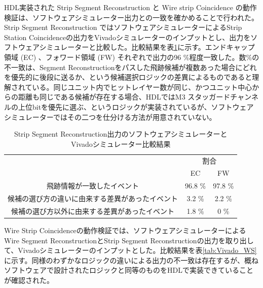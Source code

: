 HDL実装された Strip Segment Reconstruction と Wire strip Coincidence の動作検証は、ソフトウェアシミュレーター出力との一致を確かめることで行われた。Strip Segment Reconstruction ではソフトウェアシミュレーターによるStrip Station Coincidenceの出力をVivadoシミュレーターのインプットとし、出力をソフトウェアシミュレーターと比較した。比較結果を表\ref{tab:Vivado_strip}に示す。エンドキャップ領域 (EC) 、フォワード領域 (FW) それぞれで出力の96 \%程度一致した。数\%の不一致は、Segment Reconstructionをパスした飛跡候補が複数あった場合にどれを優先的に後段に送るか、という候補選択ロジックの差異によるものであると理解されている。同じユニット内でヒットレイヤー数が同じ、かつユニット中心からの距離も同じである候補が存在する場合、HDLではM3 スタッガードチャンネルの上位bitを優先に選ぶ、というロジックが実装されているが、ソフトウェアシミュレーターではその二つを仕分ける方法が用意されていない。

\begin{table}[]
    \centering
    \caption{Strip Segment Reconstruction出力のソフトウェアシミュレーターとVivadoシミュレーター比較結果}
    \label{tab:Vivado_strip}
    \begin{tabular}{|c|cc|}
    \hline
    \multirow{2}{*}{}        & \multicolumn{2}{c|}{割合}                \\ \cline{2-3} 
                             & \multicolumn{1}{c|}{EC}      & FW      \\ \hline\hline
    飛跡情報が一致したイベント            & \multicolumn{1}{c|}{96.8 \%} & 97.8 \% \\ \hline
    候補の選び方の違いに由来する差異があったイベント & \multicolumn{1}{c|}{3.2 \%}  & 2.2 \%  \\ \hline
    候補の選び方以外に由来する差異があったイベント  & \multicolumn{1}{c|}{1.8 \%}  & 0 \%    \\ \hline
    \end{tabular}
\end{table}

Wire Strip Coincidenceの動作検証では、ソフトウェアシミュレーターによるWire Segment ReconstructionとStrip Segment Reconstructionの出力を取り出して、Vivadoシミュレーターのインプットとした。比較結果を表\ref{tab:Vivado_WS}に示す。同様のわずかなロジックの違いによる出力の不一致は存在するが、概ねソフトウェアで設計されたロジックと同等のものをHDLで実装できていることが確認された。

